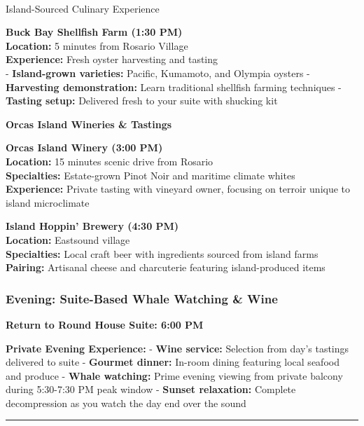 \documentclass[
  11pt,
  letterpaper,
  DIV=10,
  numbers=noendperiod]{scrartcl}
\makeatletter
\let\oldparagraph\paragraph
\renewcommand{\paragraph}{
    \@ifstar
      \xxxParagraphStar
      \xxxParagraphNoStar
  }
\newcommand{\xxxParagraphStar}[1]{\oldparagraph*{#1}\mbox{}}
\newcommand{\xxxParagraphNoStar}[1]{\oldparagraph{#1}\mbox{}}
\makeatother
\begin{document}
\paragraph{Island-Sourced Culinary
Experience}\label{island-sourced-culinary-experience}

\textbf{Buck Bay Shellfish Farm (1:30 PM)}\\
\textbf{Location:} 5 minutes from Rosario Village\\
\textbf{Experience:} Fresh oyster harvesting and tasting\\
- \textbf{Island-grown varieties:} Pacific, Kumamoto, and Olympia
oysters - \textbf{Harvesting demonstration:} Learn traditional shellfish
farming techniques - \textbf{Tasting setup:} Delivered fresh to your
suite with shucking kit

\textbf{Orcas Island Wineries \& Tastings}

\textbf{Orcas Island Winery (3:00 PM)}\\
\textbf{Location:} 15 minutes scenic drive from Rosario\\
\textbf{Specialties:} Estate-grown Pinot Noir and maritime climate
whites\\
\textbf{Experience:} Private tasting with vineyard owner, focusing on
terroir unique to island microclimate

\textbf{Island Hoppin' Brewery (4:30 PM)}\\
\textbf{Location:} Eastsound village\\
\textbf{Specialties:} Local craft beer with ingredients sourced from
island farms\\
\textbf{Pairing:} Artisanal cheese and charcuterie featuring
island-produced items

\subsubsection{Evening: Suite-Based Whale Watching \&
Wine}\label{evening-suite-based-whale-watching-wine}

\textbf{Return to Round House Suite: 6:00 PM}

\textbf{Private Evening Experience:} - \textbf{Wine service:} Selection
from day's tastings delivered to suite - \textbf{Gourmet dinner:}
In-room dining featuring local seafood and produce - \textbf{Whale
watching:} Prime evening viewing from private balcony during 5:30-7:30
PM peak window - \textbf{Sunset relaxation:} Complete decompression as
you watch the day end over the sound

\begin{center}\rule{0.5\linewidth}{0.5pt}\end{center}
\end{document}
